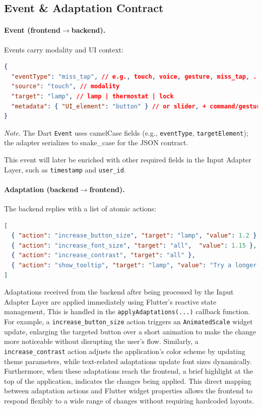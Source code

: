 \documentclass[openany]{book}
\begin{document}
\subsection{Event \& Adaptation Contract}
\paragraph{Event (frontend$\rightarrow$backend).} Events carry modality and UI context:
\begin{lstlisting}[language=json, basicstyle=\ttfamily\small, caption={Event structure}]
{
  "eventType": "miss_tap", // e.g., touch, voice, gesture, miss_tap, ...
  "source": "touch", // modality
  "target": "lamp", // lamp | thermostat | lock
  "metadata": { "UI_element": "button" } // or slider, + command/gesture fields
}
\end{lstlisting}
\noindent\emph{Note.} The Dart \texttt{Event} uses camelCase fields (e.g., \texttt{eventType}, \texttt{targetElement}); the adapter serializes to snake\_case for the JSON contract.

This event will later be enriched with other required fields in the Input Adapter Layer, such as \texttt{timestamp} and \texttt{user\_id}.

\paragraph{Adaptation (backend$\rightarrow$frontend).} The backend replies with a list of atomic actions:
\begin{lstlisting}[language=json, basicstyle=\ttfamily\small, caption={Adaptation example actions}]
[
  { "action": "increase_button_size", "target": "lamp", "value": 1.2 },
  { "action": "increase_font_size", "target": "all",  "value": 1.15 },
  { "action": "increase_contrast", "target": "all" },
  { "action": "show_tooltip", "target": "lamp", "value": "Try a longer press" }
]
\end{lstlisting}

Adaptations received from the backend after being processed by the Input Adapter Layer are applied immediately using Flutter’s reactive state management, This is handled in the \verb|applyAdaptations(...)| callback function. For example, a \texttt{increase\_button\_size} action triggers an \texttt{AnimatedScale} widget update, enlarging the targeted button over a short animation to make the change more noticeable without disrupting the user’s flow. Similarly, a \texttt{increase\_contrast} action adjusts the application’s color scheme by updating theme parameters, while text-related adaptations update font sizes dynamically. Furthermore, when these adaptations reach the frontend, a brief highlight at the top of the application, indicates the changes being applied. This direct mapping between adaptation actions and Flutter widget properties allows the frontend to respond flexibly to a wide range of changes without requiring hardcoded layouts.
\end{document}
